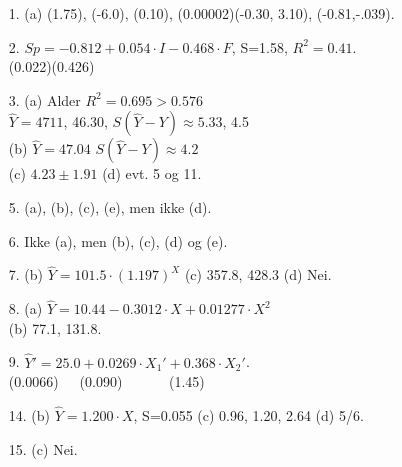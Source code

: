 \begin{itemize}         
\item[1.]  (a) (1.75), (-6.0), (0.10), (0.00002)(-0.30, 3.10),
              (-0.81,-.039).
\item[2.]  $Sp=-0.812+0.054\cdot I-0.468\cdot F$,   S=1.58,   $R^2 =0.41$.\\
             \hspace*{2cm}    (0.022)\hspace{0.7cm}(0.426)
\item[3.]  (a) Alder $R^2 =0.695 > 0.576$\\
                 $\hat{Y}=4711$, 46.30,  $S(\hat{Y}-Y)\approx 5.33$, 4.5\\
              (b) $\hat{Y}=47.04$  $S(\hat{Y}-Y) \approx 4.2$\\
              (c) $4.23 \pm 1.91$   (d) evt. 5 og 11.
\item[5.]  (a), (b), (c), (e), men ikke (d).
\item[6.]  Ikke (a), men (b), (c), (d) og (e).
\item[7.]  (b) $\hat{Y}=101.5\cdot (1.197)^X$    (c) 357.8, 428.3   (d) Nei.
\item[8.]  (a) $\hat{Y}=10.44-0.3012\cdot X+0.01277\cdot X^2$\\
           (b) 77.1, 131.8.
\item[9.]  $\hat{Y}'=25.0 + 0.0269\cdot X_1' + 0.368\cdot X_2'$.\\
             \hspace*{0.4cm} (0.0066)\ \ \    (0.090) \ \ \ \ \ \    (1.45)
\item[14.]  (b) $\hat{Y}=1.200\cdot X$,  S=0.055   (c) 0.96, 1.20, 2.64   (d) 5/6.
\item[15.]  (c) Nei.
\end{itemize}                  
         
